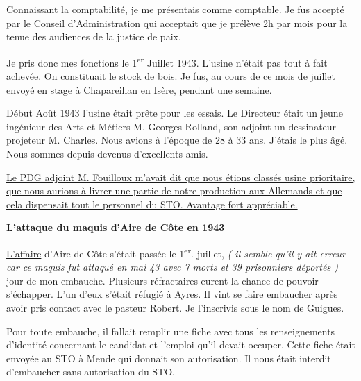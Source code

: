 \vspace{0.45cm}

Connaissant la comptabilité, je me présentais comme comptable. Je fus accepté par le Conseil
d’Administration qui acceptait que je prélève 2h par mois pour la tenue des audiences de la
justice de paix.

\vspace{0.45cm}

Je pris donc mes fonctions le 1\textsuperscript{er} Juillet 1943. L’usine n’était pas tout à fait achevée. On
constituait le stock de bois. Je fus, au cours de ce mois de juillet envoyé en stage à
Chapareillan en Isère, pendant une semaine.

\vspace{0.45cm}

Début Août 1943 l’usine était prête pour les essais. Le Directeur était un jeune ingénieur des
Arts et Métiers M. Georges Rolland, son adjoint un dessinateur projeteur M. Charles. Nous
avions à l’époque de 28 à 33 ans. J’étais le plus âgé. Nous sommes depuis devenus
d’excellents amis.

\vspace{0.45cm}

\underline{Le PDG adjoint M. Fouilloux m’avait dit que nous étions classés usine prioritaire, que nous aurions à livrer une partie de notre production aux Allemands et que cela dispensait tout le personnel du STO. Avantage fort appréciable.}

\vspace{0.55cm}

\underline{\textbf{L’attaque du maquis d’Aire de Côte en 1943}}

\vspace{0.35cm}

\underline{L’affaire} d’Aire de Côte s’était passée le 1\textsuperscript{er}. juillet, \textit{( il semble qu’il y ait erreur car ce
maquis fut attaqué en mai 43 avec 7 morts et 39 prisonniers déportés )} jour de mon
embauche. Plusieurs réfractaires eurent la chance de pouvoir s’échapper. L’un d’eux s’était
réfugié à Ayres. Il vint se faire embaucher après avoir pris contact avec le pasteur Robert. Je
l’inscrivis sous le nom de Guigues.

\vspace{0.45cm}

Pour toute embauche, il fallait remplir une fiche avec tous les renseignements d’identité
concernant le candidat et l’emploi qu’il devait occuper. Cette fiche était envoyée au STO à
Mende qui donnait son autorisation. Il nous était interdit d’embaucher sans autorisation du
STO.

